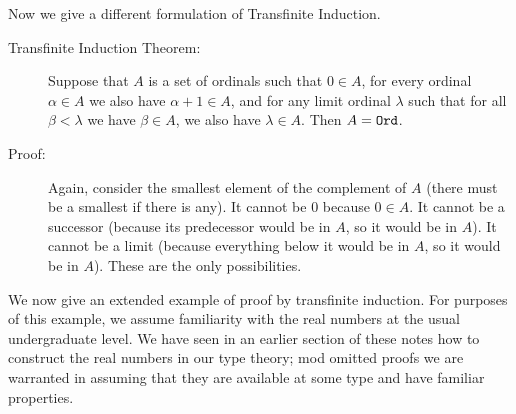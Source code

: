 \documentclass[12pt]{book}
\begin{document}
Now we give a different formulation of Transfinite Induction.

\begin{description}

\item[Transfinite Induction Theorem:] Suppose that $A$ is a set of
ordinals such that $0 \in A$, for every ordinal $\alpha \in A$ we also
have $\alpha+1\in A$, and for any limit ordinal $\lambda$ such that
for all $\beta<\lambda$ we have $\beta \in A$, we also have $\lambda
\in A$.  Then $A = {\tt Ord}$.

\item[Proof:] Again, consider the smallest element of the complement
of $A$ (there must be a smallest if there is any).  It cannot be 0
because $0 \in A$.  It cannot be a successor (because its predecessor
would be in $A$, so it would be in $A$).  It cannot be a limit
(because everything below it would be in $A$, so it would be in $A$).
These are the only possibilities.

\end{description}

We now give an extended example of proof by transfinite induction.
For purposes of this example, we assume familiarity with the real
numbers at the usual undergraduate level.  We have seen in an earlier
section of these notes how to construct the real numbers in our type
theory; mod omitted proofs we are warranted in assuming that they are available at
some type and have familiar properties.
\end{document}
